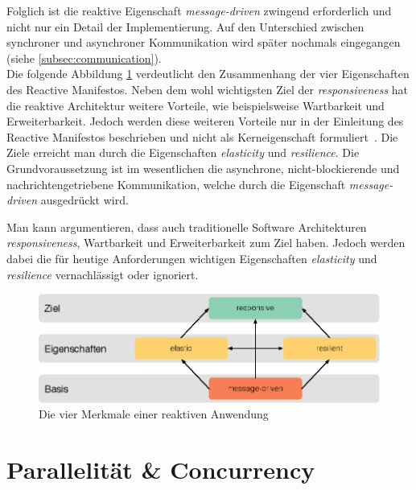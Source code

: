 Folglich ist die reaktive Eigenschaft \textit{message-driven} zwingend erforderlich und nicht nur ein Detail der Implementierung. Auf den Unterschied zwischen synchroner und asynchroner Kommunikation wird später nochmals eingegangen (siehe \ref{subsec:communication}).\\

Die folgende Abbildung \ref{fig:four-traits} verdeutlicht den Zusammenhang der vier Eigenschaften des Reactive Manifestos. Neben dem wohl wichtigsten Ziel der \textit{responsiveness} hat die reaktive Architektur weitere Vorteile, wie beispielsweise Wartbarkeit und Erweiterbarkeit. Jedoch werden diese weiteren Vorteile nur in der Einleitung des Reactive Manifestos beschrieben und nicht als Kerneigenschaft formuliert~\cite{boner_reactive_2014}. Die Ziele erreicht man durch die Eigenschaften \textit{elasticity} und \textit{resilience}. Die Grundvoraussetzung ist im wesentlichen die asynchrone, nicht-blockierende und nachrichtengetriebene Kommunikation, welche durch die Eigenschaft \textit{message-driven} ausgedrückt wird.

\pagebreak

Man kann argumentieren, dass auch traditionelle Software Architekturen \textit{responsiveness}, Wartbarkeit und Erweiterbarkeit zum Ziel haben. Jedoch werden dabei die für heutige Anforderungen wichtigen Eigenschaften \textit{elasticity} und \textit{resilience} vernachlässigt oder ignoriert.

\begin{figure}[H]
 \centering
 \includegraphics[width=1.0\textwidth]{3-Grundlagen/four-traits/four-traits.eps}
 \caption{Die vier Merkmale einer reaktiven Anwendung \cite{kuhn_code_2015}}
 \label{fig:four-traits}
\end{figure}

\pagebreak

\section{Parallelität \& Concurrency}

